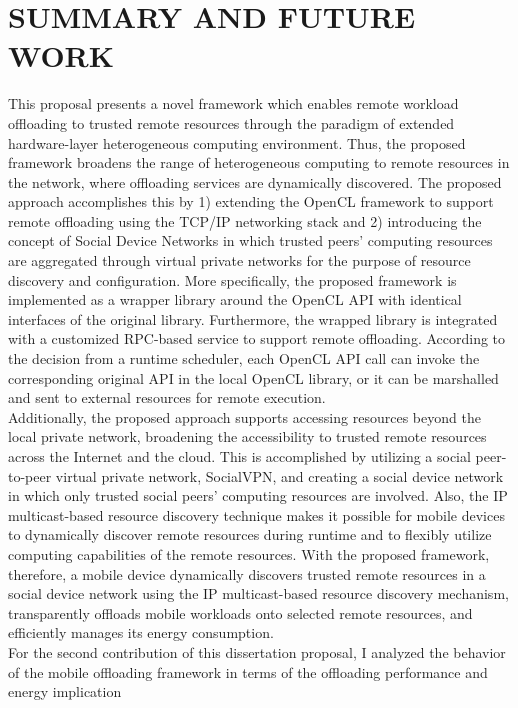 \chapter{SUMMARY AND FUTURE WORK}
\label{chap:summary}
%
This proposal presents a novel framework which enables remote workload
offloading to trusted remote resources through the
paradigm of extended hardware-layer heterogeneous computing environment.
%
Thus, the proposed framework broadens the range of heterogeneous
computing to remote resources in the network, where offloading services
are dynamically discovered. 
%
The proposed approach accomplishes this by 1) extending the OpenCL framework to
support remote offloading using the TCP/IP networking stack and 
2) introducing the concept of Social Device Networks in
which trusted peers' computing resources are aggregated through
virtual private networks for the purpose of resource discovery and
configuration.  
%
More specifically, the proposed framework is implemented as a wrapper
library around the OpenCL API with identical interfaces of the 
original library.
%
Furthermore, the wrapped library is integrated with a customized RPC-based
service to support remote offloading.
%
According to the decision from a runtime scheduler, each OpenCL API call
can invoke the corresponding original API in the local OpenCL library, or it
can be marshalled and sent to external resources for remote
execution.\\
%
Additionally, the proposed approach supports accessing resources beyond
the local private network, broadening the accessibility to trusted
remote resources across the Internet and the cloud.
%
This is accomplished by utilizing a social peer-to-peer virtual private
network, SocialVPN, and creating a social device network in which only
trusted social peers' computing resources are involved.
%
Also, the IP multicast-based resource discovery technique makes it possible
for mobile devices to dynamically discover remote resources during
runtime and to flexibly utilize computing capabilities of the remote resources.
%
With the proposed framework, therefore, a mobile device dynamically
discovers trusted remote resources in a social device network using the IP
multicast-based resource discovery mechanism, transparently offloads 
mobile workloads onto selected remote resources, and efficiently manages 
its energy consumption.\\   
%
For the second contribution of this dissertation proposal, 
I analyzed the behavior of the mobile offloading
framework in terms of the offloading performance and energy implication
